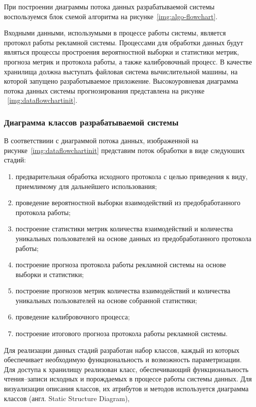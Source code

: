 При построении диаграммы потока данных разрабатываемой системы  воспользуемся блок схемой алгоритма на рисунке~\ref{img:algo-flowchart}.

Входными данными, использумыми в процессе работы системы, является протокол работы рекламной системы.
Процессами для обработки данных будут являться процессы простроения вероятностной выборки и статистики метрик,
прогноза метрик и протокола работы, а также калибровочный процесс. В качестве хранилища должна выступать файловая система
вычислительной машины, на которой запущено разработываемое приложение. Высокоуровневая диаграмма потока данных системы прогнозирования
представлена на рисунке ~\ref{img:dataflowchartinit}.


\subsubsection{Диаграмма классов разрабатываемой системы}
В соответствиии с диаграммой потока данных, изображенной на рисунке~\ref{img:dataflowchartinit} представим поток обработки
в виде следуюших стадий:
\begin{enumerate}
    \item предварительная обработка исходного протокола с целью приведения к виду, приемлимому для дальнейшего использования;
    \item проведение вероятностной выборки взаимодействий из предобработанного протокола работы;
    \item построение статистики метрик количества взаимодействий и количества уникальных пользователей на основе данных
    из предобработанного протокола работы;
    \item построение прогноза протокола работы рекламной системы на основе выборки и статистики;
    \item построение прогнозов метрик количества взаимодействий и количества уникальных пользователей на основе собранной
    статистики;
    \item проведение калибровочного процесса;
    \item построение итогового прогноза протокола работы рекламной системы.
\end{enumerate}

Для реализации данных стадий разработан набор классов, каждый из которых обеспечивает необходимую функциональность и
возможность параметризации. Для доступа к хранилищу реализован класс, обеспечивающий функциональность чтения--записи
исходных и порождаемых в процессе работы системы данных. Для визуализации описания классов, их атрибутов и 
методов используется диаграмма классов (англ. Static Structure Diagram),

